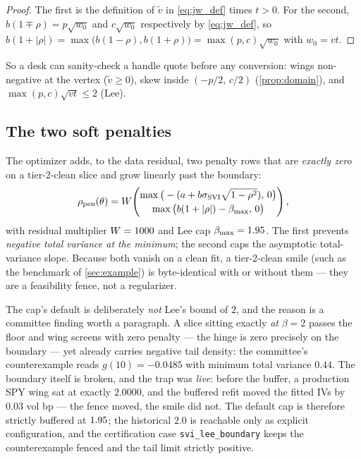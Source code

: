 \documentclass[11pt]{article}
\begin{document}
\begin{proof}
The first is the definition of $\widetilde v$ in \eqref{eq:jw_def} times
$t>0$. For the second, $b(1\mp\rho)=p\sqrt{w_0}$ and $c\sqrt{w_0}$
respectively by \eqref{eq:jw_def}, so
$b(1+|\rho|)=\max\big(b(1-\rho),b(1+\rho)\big)=\max(p,c)\sqrt{w_0}$ with
$w_0=vt$.
\end{proof}

So a desk can sanity-check a handle quote before any conversion: wings
non-negative at the vertex ($\widetilde v\ge0$), skew inside
$(-p/2,\,c/2)$ (\cref{prop:domain}), and $\max(p,c)\sqrt{vt}\le2$ (Lee).

\subsection{The two soft penalties}
\label{sec:penalties}

The optimizer adds, to the data residual, two penalty rows that are
\emph{exactly zero} on a tier-2-clean slice and grow linearly past the
boundary:
\begin{equation}
\rho_{\text{pen}}(\theta)=W\!\begin{pmatrix}
\max\big(-(a+b\sigma_{\mathrm{SVI}}\sqrt{1-\rho^2}),\,0\big)\\[2pt]
\max\big(b(1+|\rho|)-\beta_{\max},\,0\big)
\end{pmatrix},
\label{eq:svi_penalties}
\end{equation}
with residual multiplier $W=1000$ and Lee cap
$\beta_{\max}=1.95$. The first prevents \emph{negative total variance at
the minimum}; the second caps the asymptotic total-variance slope. Because
both vanish on a clean fit, a tier-2-clean smile (such as the benchmark of
\cref{sec:example}) is byte-identical with or without them --- they are a
feasibility fence, not a regularizer.

The cap's default is deliberately \emph{not} Lee's bound of $2$, and the
reason is a committee finding worth a paragraph. A slice sitting exactly
\emph{at} $\beta=2$ passes the floor and wing screens with zero penalty ---
the hinge is zero precisely on the boundary --- yet already carries negative
tail density: the committee's counterexample reads $g(10)=-0.0485$ with
minimum total variance $0.44$. The boundary itself is broken, and the trap
was \emph{live}: before the buffer, a production SPY wing sat at exactly
$2.0000$, and the buffered refit moved the fitted IVs by $0.03$ vol bp ---
the fence moved, the smile did not. The default cap is therefore strictly
buffered at $1.95$; the historical $2.0$ is reachable only as explicit
configuration, and the certification case \texttt{svi\_lee\_boundary} keeps
the counterexample fenced and the tail limit strictly positive.
\end{document}

